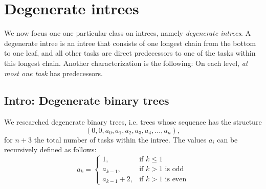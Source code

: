 


\section{Degenerate intrees}
\label{sec:p3-degenerate-intrees}


We now focus one one particular class on intrees, namely \emph{degenerate intrees}. A degenerate intree is an intree that consists of one longest chain from the bottom to one leaf, and all other tasks are direct predecessors to one of the tasks within this longest chain. Another characterization is the following: On each level, \emph{at most one task} has predecessors.

\subsection{Intro: Degenerate binary trees}
\label{sec:p3-degenerate-trees-binary}

We researched degenerate binary trees, i.e. trees whose sequence has the structure
\begin{equation*}
  \left( 0,0,a_0,a_1,a_2,a_3,a_4,\dots,a_n \right),
\end{equation*}
for $n+3$ the total number of tasks within the intree. The values $a_i$ can be recursively defined as follows:
\begin{equation*}
  a_k =
  \begin{cases}
    1, & \text{if } k\leq 1 \\
    a_{k-1}, & \text{if } k>1 \text{ is odd} \\
    a_{k-1}+2, & \text{if } k>1 \text{ is even}
  \end{cases}
\end{equation*}


